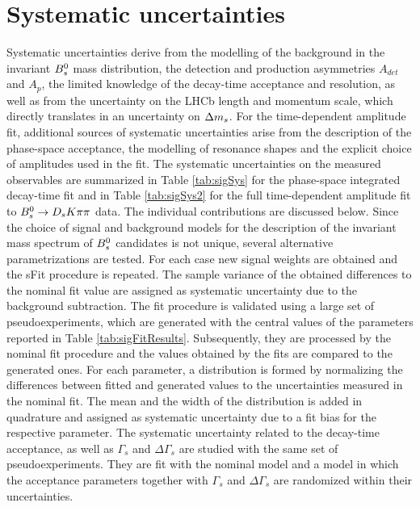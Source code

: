 \section{Systematic uncertainties}
\label{sec:Systematics}

Systematic uncertainties derive from the modelling of the background in the invariant ${{B}^0_{s}}$ mass distribution, the detection and production asymmetries $A_{det}$ and $A_{p}$, 
the limited knowledge of the decay-time acceptance and resolution, as well as from the uncertainty on the LHCb length and momentum scale, which directly translates in an uncertainty on ${\Delta m_{{s}}}$.
For the time-dependent amplitude fit, additional sources of systematic uncertainties arise from the description of the phase-space acceptance, the modelling of resonance shapes and the explicit choice of amplitudes used in the fit.
The systematic uncertainties on the measured observables are summarized in Table \ref{tab:sigSys} for the phase-space integrated decay-time fit
and in Table \ref{tab:sigSys2} for the full time-dependent amplitude fit to ${{B}^0_{s}}\rightarrow{\ensuremath{{D}_{s}}}{\ensuremath{K}}{\ensuremath{\pi}}{\ensuremath{\pi}}$ data. 
The individual contributions are discussed below.\newline
Since the choice of signal and background models for the description of the invariant mass spectrum of ${{B}^0_{s}}$ candidates is not unique, several alternative parametrizations are tested. 
For each case new signal weights are obtained and the sFit procedure is repeated. 
The sample variance of the obtained differences to the nominal fit value are assigned as systematic uncertainty due to the background subtraction.\newline 
The fit procedure is validated using a large set of pseudoexperiments, which are generated with the central values of the \CP parameters reported in Table \ref{tab:sigFitResults}. 
Subsequently, they are processed by the nominal fit procedure and the values obtained by the fits are compared to the generated ones. 
For each parameter, a distribution is formed by normalizing the differences between fitted and generated values to the uncertainties measured in the nominal fit. 
The mean and the width of the distribution is added in quadrature and assigned as systematic uncertainty due to a fit bias for the respective parameter.\newline 
The systematic uncertainty related to the decay-time acceptance, as well as $\Gamma_s$ and $\Delta\Gamma_s$ are studied with the same set of pseudoexperiments. 
They are fit with the nominal model and a model in which the acceptance parameters together with $\Gamma_s$ and $\Delta\Gamma_s$ are randomized within their uncertainties.
